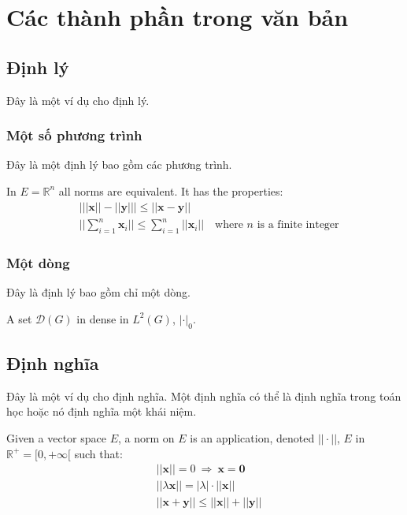 \documentclass[12pt,fleqn]{book} %
\begin{document}
\chapter{Các thành phần trong văn bản}

\section{Định lý}

Đây là một ví dụ cho định lý.

\subsection{Một số phương trình}

Đây là một định lý bao gồm các phương trình.

\begin{theorem}
In $E=\mathbb{R}^n$ all norms are equivalent. It has the properties:
\begin{align}
& \big| ||\mathbf{x}|| - ||\mathbf{y}|| \big|\leq || \mathbf{x}- \mathbf{y}||\\
&  ||\sum_{i=1}^n\mathbf{x}_i||\leq \sum_{i=1}^n||\mathbf{x}_i||\quad\text{where $n$ is a finite integer}
\end{align}
\end{theorem}

\subsection{Một dòng}

Đây là định lý bao gồm chỉ một dòng.

\begin{theorem}
A set $\mathcal{D}(G)$ in dense in $L^2(G)$, $|\cdot|_0$. 
\end{theorem}


\section{Định nghĩa}

Đây là một ví dụ cho định nghĩa. Một định nghĩa có thể là định nghĩa trong toán học hoặc nó định nghĩa một khái niệm.

\begin{definition}
Given a vector space $E$, a norm on $E$ is an application, denoted $||\cdot||$, $E$ in $\mathbb{R}^+=[0,+\infty[$ such that:
\begin{align}
& ||\mathbf{x}||=0\ \Rightarrow\ \mathbf{x}=\mathbf{0}\\
& ||\lambda \mathbf{x}||=|\lambda|\cdot ||\mathbf{x}||\\
& ||\mathbf{x}+\mathbf{y}||\leq ||\mathbf{x}||+||\mathbf{y}||
\end{align}
\end{definition}
\end{document}
